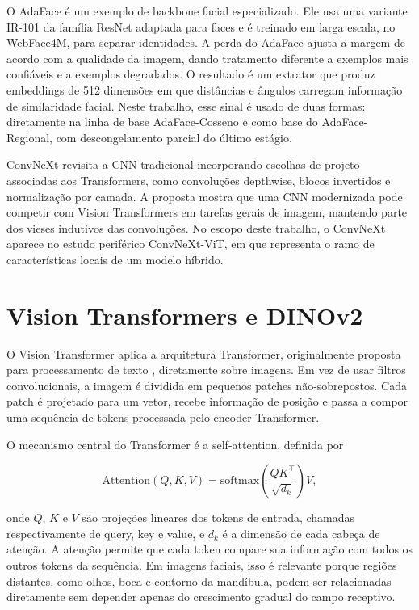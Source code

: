 O AdaFace \cite{kim2022adaface} é um exemplo de backbone facial especializado. Ele usa uma variante IR-101 da família ResNet adaptada para faces e é treinado em larga escala, no WebFace4M, para separar identidades. A perda do AdaFace ajusta a margem de acordo com a qualidade da imagem, dando tratamento diferente a exemplos mais confiáveis e a exemplos degradados. O resultado é um extrator que produz embeddings de 512 dimensões em que distâncias e ângulos carregam informação de similaridade facial. Neste trabalho, esse sinal é usado de duas formas: diretamente na linha de base AdaFace-Cosseno e como base do AdaFace-Regional, com descongelamento parcial do último estágio.

ConvNeXt \cite{liu2022convnet} revisita a CNN tradicional incorporando escolhas de projeto associadas aos Transformers, como convoluções depthwise, blocos invertidos e normalização por camada. A proposta mostra que uma CNN modernizada pode competir com Vision Transformers em tarefas gerais de imagem, mantendo parte dos vieses indutivos das convoluções. No escopo deste trabalho, o ConvNeXt aparece no estudo periférico ConvNeXt-ViT, em que representa o ramo de características locais de um modelo híbrido.

\section{Vision Transformers e DINOv2}

O Vision Transformer \cite{dosovitskiy2020image} aplica a arquitetura Transformer, originalmente proposta para processamento de texto \cite{vaswani2017attention},
diretamente sobre imagens. Em vez de usar filtros convolucionais, a imagem é dividida em pequenos patches não-sobrepostos. Cada patch é projetado para um vetor, recebe informação de posição e passa a compor uma sequência de tokens processada pelo encoder Transformer.

O mecanismo central do Transformer é a self-attention, definida por

\begin{equation}
\text{Attention}(Q, K, V) = \mathrm{softmax}\!\left( \frac{QK^\top}{\sqrt{d_k}} \right) V,
\label{eq:attention}
\end{equation}

onde $Q$, $K$ e $V$ são projeções lineares dos tokens de entrada, chamadas respectivamente de query, key e value, e $d_k$ é a dimensão de cada cabeça de atenção. A atenção permite que cada token compare sua informação com todos os outros tokens da sequência. Em imagens faciais, isso é relevante porque regiões distantes, como olhos, boca e contorno da mandíbula, podem ser relacionadas diretamente sem depender apenas do crescimento gradual do campo receptivo.

